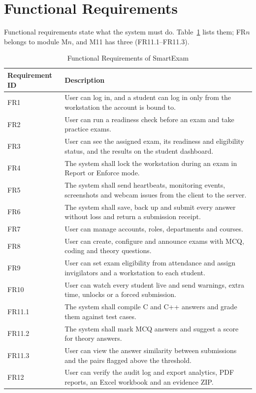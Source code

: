 \section{Functional Requirements}
Functional requirements state what the system must do. Table~\ref{tab:functionalrequirements} lists them; FR$n$ belongs to module M$n$, and M11 has three (FR11.1--FR11.3).

\begin{table}[H]
\centering
\caption{Functional Requirements of SmartExam}
\label{tab:functionalrequirements}
\renewcommand{\arraystretch}{1.2}
\begin{tabularx}{\linewidth}{l>{\raggedright\arraybackslash}X}
\hline\hline
\textbf{Requirement ID} & \textbf{Description} \\
\hline
FR1 & User can log in, and a student can log in only from the workstation the account is bound to. \\
FR2 & User can run a readiness check before an exam and take practice exams. \\
FR3 & User can see the assigned exam, its readiness and eligibility status, and the results on the student dashboard. \\
FR4 & The system shall lock the workstation during an exam in Report or Enforce mode. \\
FR5 & The system shall send heartbeats, monitoring events, screenshots and webcam issues from the client to the server. \\
FR6 & The system shall save, back up and submit every answer without loss and return a submission receipt. \\
FR7 & User can manage accounts, roles, departments and courses. \\
FR8 & User can create, configure and announce exams with MCQ, coding and theory questions. \\
FR9 & User can set exam eligibility from attendance and assign invigilators and a workstation to each student. \\
FR10 & User can watch every student live and send warnings, extra time, unlocks or a forced submission. \\
FR11.1 & The system shall compile C and C++ answers and grade them against test cases. \\
FR11.2 & The system shall mark MCQ answers and suggest a score for theory answers. \\
FR11.3 & User can view the answer similarity between submissions and the pairs flagged above the threshold. \\
FR12 & User can verify the audit log and export analytics, PDF reports, an Excel workbook and an evidence ZIP. \\
\hline\hline
\end{tabularx}
\end{table}

